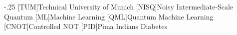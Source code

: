 \documentclass[headsepline,footsepline,footinclude=false,oneside,fontsize=11pt,paper=a4,listof=totoc,bibliography=totoc]{scrbook} %
\begin{document}


\frontmatter{}





\tableofcontents{}

\mainmatter{}







\appendix{}


\begin{acronym}
	\itemsep-.25\baselineskip{}
	[TUM]{Technical University of Munich}
	[NISQ]{Noisy Intermediate-Scale Quantum}
	[ML]{Machine Learning}
	[QML]{Quantum Machine Learning}
	[CNOT]{Controlled NOT}
	[PID]{Pima Indians Diabetes}
\end{acronym}

\listoffigures{}
\listoftables{}
\printbibliography{}
\end{document}
